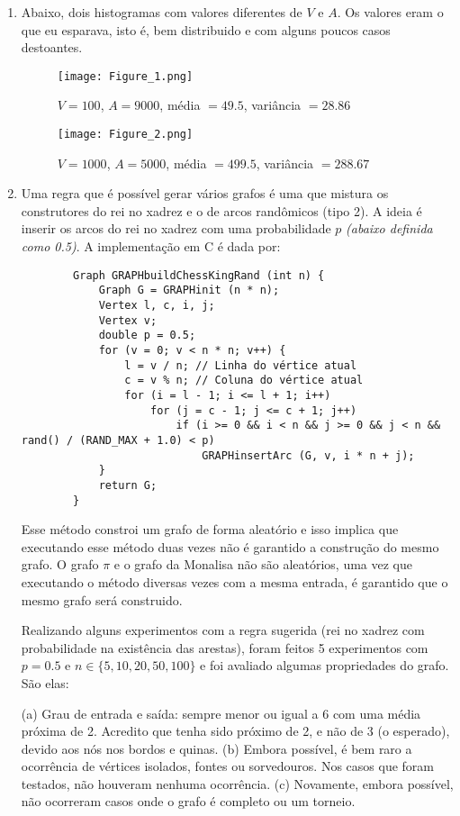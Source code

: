 \documentclass[12pt,letterpaper]{article}
\begin{document}
\begin{enumerate}
    \item Abaixo, dois histogramas com valores diferentes de $V$ e $A$. Os valores eram o que eu esparava, isto é, bem distribuido e com alguns poucos casos destoantes.
    
    \begin{figure}[H]
    \caption{$V = 100$, $A = 9000$, média $= 49.5$, variância $= 28.86$}
    \centering
    \texttt{[image: Figure\_1.png]}
    \end{figure}
    
    \begin{figure}[H]
    \caption{$V = 1000$, $A = 5000$, média $= 499.5$, variância $= 288.67$}
    \centering
    \texttt{[image: Figure\_2.png]}
    \end{figure}
    
    \item Uma regra que é possível gerar vários grafos é uma que mistura os construtores do rei no xadrez e o de arcos randômicos (tipo 2). A ideia é inserir os arcos do rei no xadrez com uma probabilidade $p$ \textit{(abaixo definida como 0.5)}. A implementação em C é dada por:
    \begin{lstlisting}
        Graph GRAPHbuildChessKingRand (int n) {
            Graph G = GRAPHinit (n * n);
            Vertex l, c, i, j;
            Vertex v;
            double p = 0.5;
            for (v = 0; v < n * n; v++) {
                l = v / n; // Linha do vértice atual
                c = v % n; // Coluna do vértice atual
                for (i = l - 1; i <= l + 1; i++)
                    for (j = c - 1; j <= c + 1; j++)
                        if (i >= 0 && i < n && j >= 0 && j < n && rand() / (RAND_MAX + 1.0) < p)
                            GRAPHinsertArc (G, v, i * n + j);
            }
            return G;
        }
    \end{lstlisting}
    
    Esse método constroi um grafo de forma aleatório e isso implica que executando esse método duas vezes não é garantido a construção do mesmo grafo. O grafo $\pi$ e o grafo da Monalisa não são aleatórios, uma vez que executando o método diversas vezes com a mesma entrada, é garantido que o mesmo grafo será construido.
    
    Realizando alguns experimentos com a regra sugerida (rei no xadrez com probabilidade na existência das arestas), foram feitos 5 experimentos com $p = 0.5$ e $n \in \{ 5, 10, 20, 50, 100 \}$ e foi avaliado algumas propriedades do grafo. São elas:
    
    \subitem (a) Grau de entrada e saída: sempre menor ou igual a 6 com uma média próxima de 2. Acredito que tenha sido próximo de 2, e não de 3 (o esperado), devido aos nós nos bordos e quinas.
    \subitem (b) Embora possível, é bem raro a ocorrência de vértices isolados, fontes ou sorvedouros. Nos casos que foram testados, não houveram nenhuma ocorrência.
    \subitem (c) Novamente, embora possível, não ocorreram casos onde o grafo é completo ou um torneio.
    
\end{enumerate}
\end{document}
